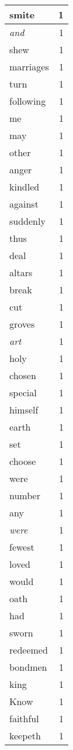 \begin{center}
\begin{longtable}{l|r}
smite & 1 \\ \hline
\emph{and} & 1 \\ \hline
shew & 1 \\ \hline
marriages & 1 \\ \hline
turn & 1 \\ \hline
following & 1 \\ \hline
me & 1 \\ \hline
may & 1 \\ \hline
other & 1 \\ \hline
anger & 1 \\ \hline
kindled & 1 \\ \hline
against & 1 \\ \hline
suddenly & 1 \\ \hline
thus & 1 \\ \hline
deal & 1 \\ \hline
altars & 1 \\ \hline
break & 1 \\ \hline
cut & 1 \\ \hline
groves & 1 \\ \hline
\emph{art} & 1 \\ \hline
holy & 1 \\ \hline
chosen & 1 \\ \hline
special & 1 \\ \hline
himself & 1 \\ \hline
earth & 1 \\ \hline
set & 1 \\ \hline
choose & 1 \\ \hline
were & 1 \\ \hline
number & 1 \\ \hline
any & 1 \\ \hline
\emph{were} & 1 \\ \hline
fewest & 1 \\ \hline
loved & 1 \\ \hline
would & 1 \\ \hline
oath & 1 \\ \hline
had & 1 \\ \hline
sworn & 1 \\ \hline
redeemed & 1 \\ \hline
bondmen & 1 \\ \hline
king & 1 \\ \hline
Know & 1 \\ \hline
faithful & 1 \\ \hline
keepeth & 1 \\ \hline

\end{longtable}
\end{center}
